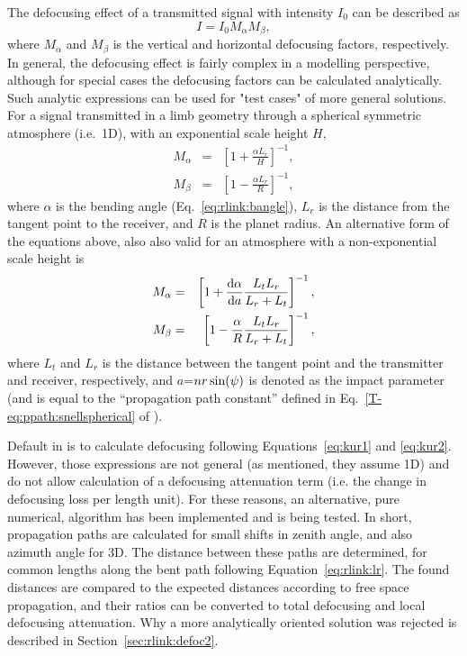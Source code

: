 The defocusing effect of a transmitted signal with intensity \(I_{0}\) can be
described as \citep{haugstad:78:turbu,kursinski:00:thegp}
\begin{equation}
\label{eq:foc1}
I=I_{0}M_{\alpha}M_{\beta},
\end{equation}
where \(M_{\alpha}\) and \(M_{\beta}\) is the vertical and horizontal
defocusing factors, respectively. In general, the defocusing effect is fairly
complex in a modelling perspective, although for special cases the defocusing
factors can be calculated analytically. Such analytic expressions can be used
for "test cases" of more general solutions. For a signal transmitted in a limb
geometry through a spherical symmetric atmosphere (i.e.\ 1D), with an
exponential scale height \(H\), \citep{haugstad:78:turbu}
\begin{eqnarray}
 M_{\alpha} &=& \left[1+\frac{\alpha L_{r}}{H} \right]^{-1}, \nonumber \\
 M_{\beta}  &=& \left[1-\frac{\alpha L_{r}}{R} \right]^{-1}, \nonumber
\end{eqnarray}
where \(\alpha\) is the bending angle (Eq.~\ref{eq:rlink:bangle}), \(L_{r}\) is
the distance from the tangent point to the receiver, and \(R\) is the planet
radius. An alternative form of the equations above, also
also valid for an atmosphere with a non-exponential scale height is
\citep{kursinski:00:thegp}
\begin{eqnarray}
 \label{eq:kur1}
 M_{\alpha} &=& \left[1+\frac{\mathrm{d} \alpha}{\mathrm{d} a} 
               \frac{{L_{t}L_{r}}}{L_{r}+L_{t}} \right]^{-1}, \\
\label{eq:kur2}
 M_{\beta} &=& \left[1-\frac{\alpha}{R}
              \frac{{L_{t}L_{r}}}{L_{r}+L_{t}} \right]^{-1},
\end{eqnarray}
where $L_{t}$ and $L_{r}$ is the distance between the tangent point and the
transmitter and receiver, respectively, and \(a\)=\(nr\sin(\psi)\) is
denoted as the impact parameter (and is equal to the ``propagation path
constant'' defined in Eq.~\ref{T-eq:ppath:snellspherical} of \theory).

Default in  is to calculate defocusing following
Equations~\ref{eq:kur1} and \ref{eq:kur2}. However, those expressions are not
general (as mentioned, they assume 1D) and do not allow calculation of a
defocusing attenuation term (i.e. the change in defocusing loss per length
unit). For these reasons, an alternative, pure numerical, algorithm has been
implemented and is being tested. In short, propagation paths are calculated for
small shifts in zenith angle, and also azimuth angle for 3D. The distance
between these paths are determined, for common lengths along the bent path
following Equation~\ref{eq:rlink:lr}. The found distances are compared to the
expected distances according to free space propagation, and their ratios can be
converted to total defocusing and local defocusing attenuation. Why a more
analytically oriented solution was rejected is described in
Section~\ref{sec:rlink:defoc2}.


